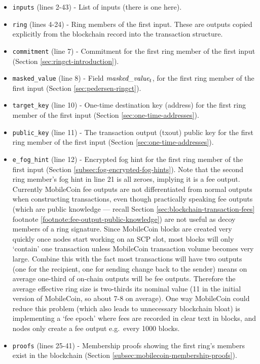 \begin{appendices}
\begin{itemize}
	\item {\tt inputs} (lines 2-43) - List of inputs (there is one here).
	\item {\tt ring} (lines 4-24) - Ring members of the first input. These are outputs copied explicitly from the blockchain record into the transaction structure.
	\item {\tt commitment} (line 7) - Commitment for the first ring member of the first input (Section \ref{sec:ringct-introduction}).
	\item {\tt masked\_value} (line 8) - Field $\textrm{\em masked\_value}_t$, for the first ring member of the first input (Section \ref{sec:pedersen-ringct}).
	\item {\tt target\_key} (line 10) - One-time destination key (address) for the first ring member of the first input (Section \ref{sec:one-time-addresses}).
	\item {\tt public\_key} (line 11) - The transaction output (txout) public key for the first ring member of the first input (Section \ref{sec:one-time-addresses}).
	\item {\tt e\_fog\_hint} (line 12) - Encrypted fog hint for the first ring member of the first input (Section \ref{subsec:fog-encrypted-fog-hints}). Note that the second ring member's fog hint in line 21 is all zeroes, implying it is a fee output. Currently MobileCoin fee outputs are not differentiated from normal outputs when constructing transactions, even though practically speaking fee outputs (which are public knowledge --- recall Section \ref{sec:blockchain-transaction-fees} footnote \ref{footnote:fee-output-public-knowledge}) are not useful as decoy members of a ring signature. Since MobileCoin blocks are created very quickly once nodes start working on an SCP slot, most blocks will only `contain' one transaction unless MobileCoin transaction volume becomes very large. Combine this with the fact most transactions will have two outputs (one for the recipient, one for sending change back to the sender) means on average one-third of on-chain outputs will be fee outputs. Therefore the average effective ring size is two-thirds its nominal value (11 in the initial version of MobileCoin, so about 7-8 on average). One way MobileCoin could reduce this problem (which also leads to unnecessary blockchain bloat) is implementing a `fee epoch' where fees are recorded in clear text in blocks, and nodes only create a fee output e.g.\ every 1000 blocks.
	\item {\tt proofs} (lines 25-41) - Membership proofs showing the first ring's members exist in the blockchain (Section \ref{subsec:mobilecoin-membership-proofs}).

\end{itemize}
\end{appendices}
